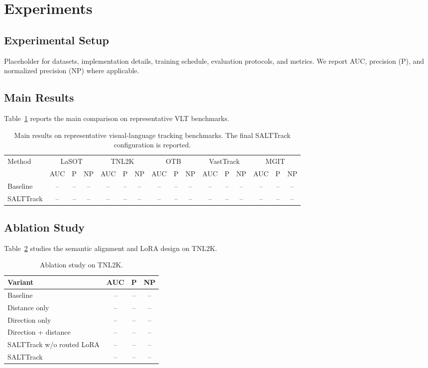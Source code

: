 \section{Experiments}
\subsection{Experimental Setup}
Placeholder for datasets, implementation details, training schedule, evaluation protocols, and metrics. We report AUC, precision (P), and normalized precision (NP) where applicable.

\subsection{Main Results}
Table~\ref{tab:main_results} reports the main comparison on representative VLT benchmarks.

\begin{table}[t]
\centering
\caption{Main results on representative visual-language tracking benchmarks. The final SALTTrack configuration is reported.}
\label{tab:main_results}
\begin{tabular}{lccccccccccccccc}
\toprule
\multirow{2}{*}{Method} &
\multicolumn{3}{c}{LaSOT} &
\multicolumn{3}{c}{TNL2K} &
\multicolumn{3}{c}{OTB} &
\multicolumn{3}{c}{VastTrack} &
\multicolumn{3}{c}{MGIT} \\
\cmidrule(lr){2-4}\cmidrule(lr){5-7}\cmidrule(lr){8-10}\cmidrule(lr){11-13}\cmidrule(lr){14-16}
& AUC & P & NP & AUC & P & NP & AUC & P & NP & AUC & P & NP & AUC & P & NP \\
\midrule
Baseline & -- & -- & -- & -- & -- & -- & -- & -- & -- & -- & -- & -- & -- & -- & -- \\
SALTTrack & -- & -- & -- & -- & -- & -- & -- & -- & -- & -- & -- & -- & -- & -- & -- \\
\bottomrule
\end{tabular}
\end{table}

\subsection{Ablation Study}
Table~\ref{tab:ablation} studies the semantic alignment and LoRA design on TNL2K.

\begin{table}[t]
\centering
\caption{Ablation study on TNL2K.}
\label{tab:ablation}
\begin{tabular}{lccc}
\toprule
Variant & AUC & P & NP \\
\midrule
Baseline & -- & -- & -- \\
Distance only & -- & -- & -- \\
Direction only & -- & -- & -- \\
Direction + distance & -- & -- & -- \\
SALTTrack w/o routed LoRA & -- & -- & -- \\
SALTTrack & -- & -- & -- \\
\bottomrule
\end{tabular}
\end{table}

